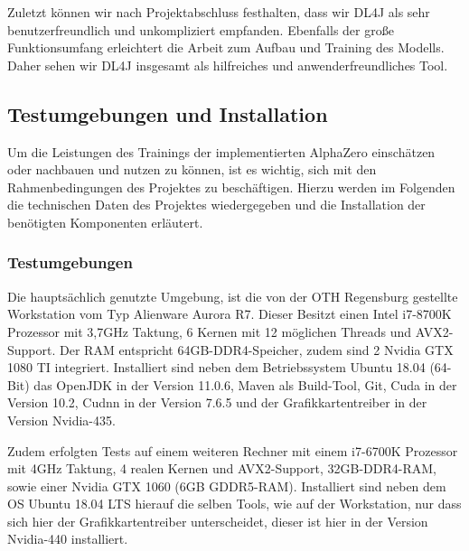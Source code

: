 \documentclass[12pt,a4paper]{article}
\begin{document}
Zuletzt können wir nach Projektabschluss festhalten, dass wir DL4J als sehr benutzerfreundlich und unkompliziert empfanden. Ebenfalls der große Funktionsumfang erleichtert die Arbeit zum Aufbau und Training des Modells. Daher sehen wir DL4J insgesamt als hilfreiches und anwenderfreundliches Tool.


\subsection{Testumgebungen und Installation}
Um die Leistungen des Trainings der implementierten AlphaZero einschätzen oder nachbauen und nutzen zu können, ist es wichtig, sich mit den Rahmenbedingungen des Projektes zu beschäftigen. Hierzu werden im Folgenden die technischen Daten des Projektes wiedergegeben und die Installation der benötigten Komponenten erläutert.

\subsubsection{Testumgebungen}
Die hauptsächlich genutzte Umgebung, ist die von der OTH Regensburg gestellte Workstation vom Typ Alienware Aurora R7. Dieser Besitzt einen Intel i7-8700K Prozessor mit 3,7GHz Taktung, 6 Kernen mit 12 möglichen Threads und AVX2-Support. Der RAM entspricht 64GB-DDR4-Speicher, zudem sind 2 Nvidia GTX 1080 TI integriert. Installiert sind neben dem Betriebssystem Ubuntu 18.04 (64-Bit) das OpenJDK in der Version 11.0.6, Maven als Build-Tool, Git, Cuda in der Version 10.2, Cudnn in der Version 7.6.5 und der Grafikkartentreiber in der Version Nvidia-435.

Zudem erfolgten Tests auf einem weiteren Rechner mit einem i7-6700K Prozessor mit 4GHz Taktung, 4 realen Kernen und AVX2-Support, 32GB-DDR4-RAM, sowie einer Nvidia GTX 1060 (6GB GDDR5-RAM). Installiert sind neben dem OS Ubuntu 18.04 LTS hierauf die selben Tools, wie auf der Workstation, nur dass sich hier der Grafikkartentreiber unterscheidet, dieser ist hier in der Version Nvidia-440 installiert. 

\end{document}
